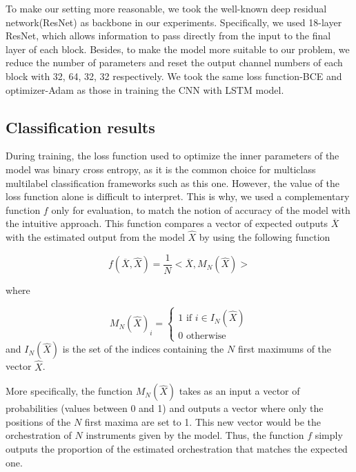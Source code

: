 \documentclass{article}
\begin{document}
To make our setting more reasonable, we took the well-known deep residual network(ResNet) as backbone in our experiments. Specifically, we used 18-layer ResNet, which allows information to pass directly from the input to the final layer of each block. Besides, to make the model more suitable to our problem, we reduce the number of parameters and reset the output channel numbers of each block with 32, 64, 32, 32 respectively. We took the same loss function-BCE and optimizer-Adam as those in training the CNN with LSTM model.

\subsection{Classification results}

During training, the loss function used to optimize the inner parameters of the model was binary cross entropy, as it is the common choice for multiclass multilabel classification frameworks such as this one. However, the value of the loss function alone is difficult to interpret. This is why, we used a complementary function $f$ only for evaluation, to match the notion of accuracy of the model with the intuitive approach. This function compares a vector of expected outputs $\overline{X}$ with the estimated output from the model $\hat{X}$ by using the following function

\begin{equation}
f(\overline{X}, \hat{X}) = \frac{1}{N}<\overline{X}, M_N(\hat{X})>
\label{eval}
\end{equation}

where

\begin{equation}
M_N(\hat{X})_i = \left\{\begin{array}{ll}
1 \text{ if } i \in I_N(\hat{X})\\
0 \text{ otherwise}
\end{array}\right.
\label{NMax}
\end{equation}
and $I_N(\hat{X})$ is the set of the indices containing the $N$ first maximums of the vector $\hat{X}$.

More specifically, the function $M_N(\hat{X})$ takes as an input a vector of probabilities (values between 0 and 1) and outputs a vector where only the positions of the $N$ first maxima are set to 1. This new vector would be the orchestration of $N$ instruments given by the model. Thus, the function $f$ simply outputs the proportion of the estimated orchestration that matches the expected one.
\end{document}
